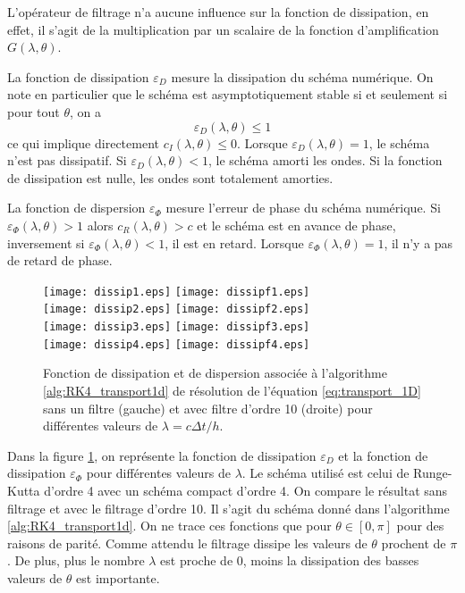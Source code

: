 L'opérateur de filtrage n'a aucune influence sur la fonction de dissipation, en effet, il s'agit de la multiplication par un scalaire de la fonction d'amplification $G(\lambda,\theta)$.

La fonction de dissipation $\varepsilon_D$ mesure la dissipation du schéma numérique. On note en particulier que le schéma est asymptotiquement stable si et seulement si pour tout $\theta$, on a 
\begin{equation}
\varepsilon_D(\lambda,\theta) \leq 1
\end{equation}
ce qui implique directement $c_I(\lambda,\theta) \leq 0$. Lorsque $\varepsilon_D(\lambda, \theta) = 1$, le schéma n'est pas dissipatif. Si $\varepsilon_D(\lambda,\theta) < 1$, le schéma amorti les ondes. Si la fonction de dissipation est nulle, les ondes sont totalement amorties.

La fonction de dispersion $\varepsilon_{\Phi}$ mesure l'erreur de phase du schéma numérique. Si $\varepsilon_{\Phi}(\lambda, \theta) > 1$ alors $c_R(\lambda,\theta) > c$ et le schéma est en avance de phase, inversement si $\varepsilon_{\Phi}(\lambda, \theta) < 1$, il est en retard. Lorsque $\varepsilon_{\Phi}(\lambda, \theta) = 1$, il n'y a pas de retard de phase.

\begin{figure}[htbp]
\begin{center}
\texttt{[image: dissip1.eps]}
\texttt{[image: dissipf1.eps]}\\
\texttt{[image: dissip2.eps]}
\texttt{[image: dissipf2.eps]}\\
\texttt{[image: dissip3.eps]}
\texttt{[image: dissipf3.eps]}\\
\texttt{[image: dissip4.eps]}
\texttt{[image: dissipf4.eps]}
\end{center}
\caption{Fonction de dissipation et de dispersion associée à l'algorithme \ref{alg:RK4_transport1d} de résolution de l'équation \eqref{eq:transport_1D} sans un filtre (gauche) et avec filtre d'ordre 10 (droite) pour différentes valeurs de $\lambda = c \Delta t / h$.}
\label{fig:dissip_disper}
\end{figure}

Dans la figure \ref{fig:dissip_disper}, on représente la fonction de dissipation $\varepsilon_D$ et la fonction de dissipation $\varepsilon_{\Phi}$ pour différentes valeurs de $\lambda$. Le schéma utilisé est celui de Runge-Kutta d'ordre 4 avec un schéma compact d'ordre 4. On compare le résultat sans filtrage et avec le filtrage d'ordre 10. Il s'agit du schéma donné dans l'algorithme \ref{alg:RK4_transport1d}.
On ne trace ces fonctions que pour $\theta \in [0, \pi]$ pour des raisons de parité. Comme attendu le filtrage dissipe les valeurs de $\theta$ prochent de $\pi$. De plus, plus le nombre $\lambda$ est proche de $0$, moins la dissipation des basses valeurs de $\theta$ est importante. 







